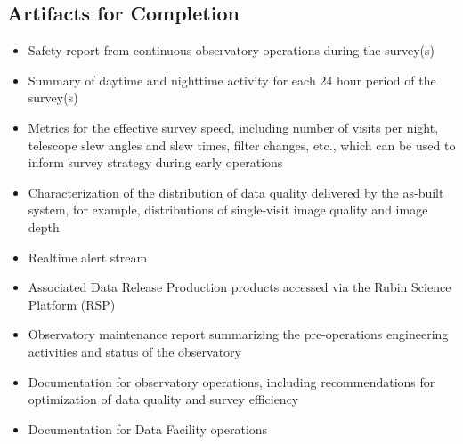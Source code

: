


\subsection{Artifacts for Completion}

\begin{itemize}
\item Safety report from continuous observatory operations during the survey(s)
\item Summary of daytime and nighttime activity for each 24 hour period of the survey(s)
\item Metrics for the effective survey speed, including number of visits per night, telescope slew angles and slew times, filter changes, etc., which can be used to inform survey strategy during early operations
\item Characterization of the distribution of data quality delivered by the as-built system, for example, distributions of single-visit image quality and image depth
\item Realtime alert stream
\item Associated Data Release Production products accessed via the Rubin Science Platform (RSP)
\item Observatory maintenance report summarizing the pre-operations engineering activities and status of the observatory
\item Documentation for observatory operations, including recommendations for optimization of data quality and survey efficiency
\item Documentation for Data Facility operations
\end{itemize}
